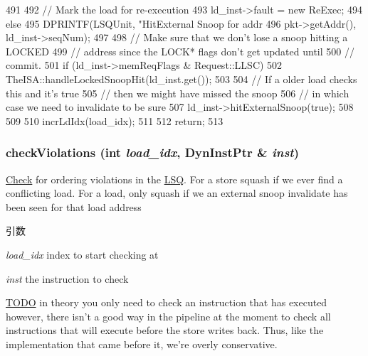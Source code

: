 \begin{DoxyCode}
{{{{491 
492                 // Mark the load for re-execution
493                 ld_inst->fault = new ReExec;
494             } else {
495                 DPRINTF(LSQUnit, "HitExternal Snoop for addr %
496                         pkt->getAddr(), ld_inst->seqNum);
497 
498                 // Make sure that we don't lose a snoop hitting a LOCKED
499                 // address since the LOCK* flags don't get updated until
500                 // commit.
501                 if (ld_inst->memReqFlags & Request::LLSC)
502                     TheISA::handleLockedSnoopHit(ld_inst.get());
503 
504                 // If a older load checks this and it's true
505                 // then we might have missed the snoop
506                 // in which case we need to invalidate to be sure
507                 ld_inst->hitExternalSnoop(true);
508             }
509         }
510         incrLdIdx(load_idx);
511     }
512     return;
513 }
\end{DoxyCode}
\hypertarget{classLSQUnit_a15239c5725d8744a793c867193e4bce7}{
\subsubsection[{checkViolations}]{ checkViolations (int {\em load\_\-idx}, \/  {\bf DynInstPtr} \& {\em inst})}}
\label{classLSQUnit_a15239c5725d8744a793c867193e4bce7}
\hyperlink{classCheck}{Check} for ordering violations in the \hyperlink{classLSQ}{LSQ}. For a store squash if we ever find a conflicting load. For a load, only squash if we an external snoop invalidate has been seen for that load address 
\begin{DoxyParams}{引数}
\item[{\em load\_\-idx}]index to start checking at \item[{\em inst}]the instruction to check \end{DoxyParams}


\begin{Desc}
\item[\hyperlink{todo__todo000039}{TODO}]in theory you only need to check an instruction that has executed however, there isn't a good way in the pipeline at the moment to check all instructions that will execute before the store writes back. Thus, like the implementation that came before it, we're overly conservative. \end{Desc}



